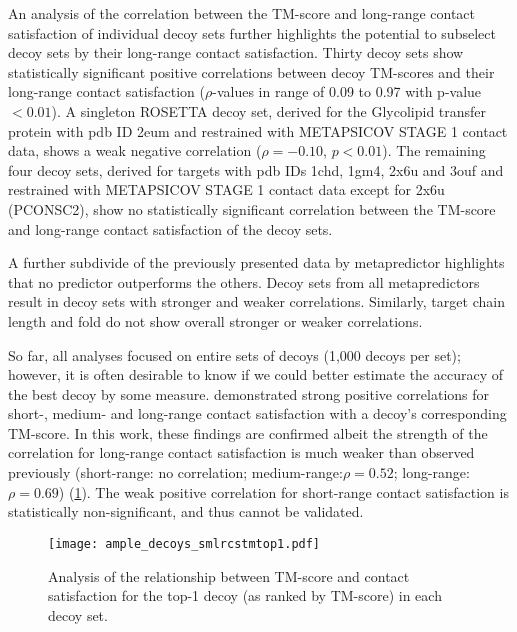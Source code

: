 An analysis of the correlation between the TM-score and long-range contact satisfaction of individual decoy sets further highlights the potential to subselect decoy sets by their long-range contact satisfaction. Thirty decoy sets show statistically significant positive correlations between decoy TM-scores and their long-range contact satisfaction ($\rho$-values in range of 0.09 to 0.97 with p-value $<0.01$). A singleton ROSETTA decoy set, derived for the Glycolipid transfer protein with \gls{pdb} ID 2eum and restrained with METAPSICOV STAGE 1 contact data, shows a weak negative correlation ($\rho=-0.10$, $p<0.01$). The remaining four decoy sets, derived for targets with \gls{pdb} IDs 1chd, 1gm4, 2x6u and 3ouf and restrained with METAPSICOV STAGE 1 contact data except for 2x6u (PCONSC2), show no statistically significant correlation between the TM-score and long-range contact satisfaction of the decoy sets. 

A further subdivide of the previously presented data by metapredictor highlights that no predictor outperforms the others. Decoy sets from all metapredictors result in decoy sets with stronger and weaker correlations. Similarly, target chain length and fold do not show overall stronger or weaker correlations. 

So far, all analyses focused on entire sets of decoys (1,000 decoys per set); however, it is often desirable to know if we could better estimate the accuracy of the best decoy by some measure. \textcite{Kosciolek2014-bt} demonstrated strong positive correlations for short-, medium- and long-range contact satisfaction with a decoy's corresponding TM-score. In this work, these findings are confirmed albeit the strength of the correlation for long-range contact satisfaction is much weaker than observed previously (short-range: no correlation; medium-range:$\rho=0.52$; long-range:$\rho=0.69$) (\cref{fig:ample_decoys_smlrcstmtop1}). The weak positive correlation for short-range contact satisfaction is statistically non-significant, and thus cannot be validated. 

\begin{figure}[H]
	\centering
        \texttt{[image: ample\_decoys\_smlrcstmtop1.pdf]}
        \caption[Top-1 decoy TM-score and contact satisfaction analysis]{Analysis of the relationship between TM-score and contact satisfaction for the top-1 decoy (as ranked by TM-score) in each decoy set.}
	\label{fig:ample_decoys_smlrcstmtop1}
\end{figure}




